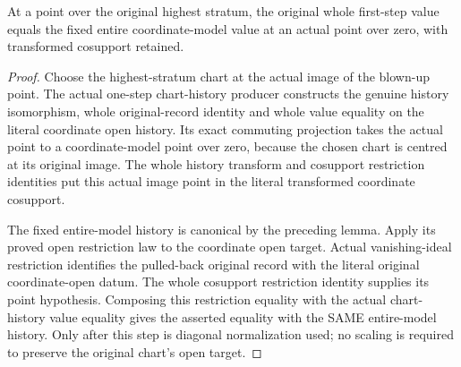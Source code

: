 \begin{lemma}
\label{hir:general-nc-original-first-value-entire-coordinate-model}
\leanok
{}
At a point over the original highest stratum, the original whole
first-step value equals the fixed entire coordinate-model value at an
actual point over zero, with transformed cosupport retained.
\end{lemma}
\begin{proof}
Choose the highest-stratum chart at the actual image of the blown-up
point. The actual one-step chart-history producer constructs the genuine
history isomorphism, whole original-record identity and whole value
equality on the literal coordinate open history. Its exact commuting
projection takes the actual point to a coordinate-model point over zero,
because the chosen chart is centred at its original image. The whole
history transform and cosupport restriction identities put this actual
image point in the literal transformed coordinate cosupport.

The fixed entire-model history is canonical by the preceding lemma.
Apply its proved open restriction law to the coordinate open target.
Actual vanishing-ideal restriction identifies the pulled-back original
record with the literal original coordinate-open datum. The whole
cosupport restriction identity supplies its point hypothesis. Composing
this restriction equality with the actual chart-history value equality
gives the asserted equality with the SAME entire-model history. Only
after this step is diagonal normalization used; no scaling is required
to preserve the original chart's open target.
\end{proof}

